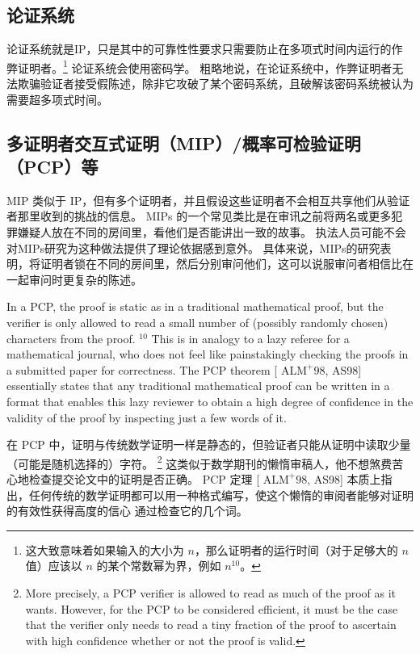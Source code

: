 \subsection{论证系统}
论证系统就是IP，只是其中的可靠性性要求只需要防止在多项式时间内运行的作弊证明者。\footnote{这大致意味着如果输入的大小为 $n$，那么证明者的运行时间（对于足够大的 $n$ 值）应该以 $n$ 的某个常数幂为界，例如 $n^{10} $。}
论证系统会使用密码学。 
粗略地说，在论证系统中，作弊证明者无法欺骗验证者接受假陈述，除非它攻破了某个密码系统，且破解该密码系统被认为需要超多项式时间。

\subsection{多证明者交互式证明（MIP）/概率可检验证明（PCP）等}
MIP 类似于 IP，但有多个证明者，并且假设这些证明者不会相互共享他们从验证者那里收到的挑战的信息。 MIPs 的一个常见类比是在审讯之前将两名或更多犯罪嫌疑人放在不同的房间里，看他们是否能讲出一致的故事。 
执法人员可能不会对MIPs研究为这种做法提供了理论依据感到意外。
具体来说，MIPs的研究表明，将证明者锁在不同的房间里，然后分别审问他们，这可以说服审问者相信比在一起审问时更复杂的陈述。

In a PCP, the proof is static as in a traditional mathematical proof, but the verifier is only allowed to read a small number of (possibly randomly chosen) characters from the proof. ${ }^{10}$ This is in analogy to a lazy referee for a mathematical journal, who does not feel like painstakingly checking the proofs in a submitted paper for correctness. The PCP theorem [ $\mathrm{ALM}^{+} 98$, AS98] essentially states that any traditional mathematical proof can be written in a format that enables this lazy reviewer to obtain a high degree of confidence in the validity of the proof by inspecting just a few words of it.

在 PCP 中，证明与传统数学证明一样是静态的，但验证者只能从证明中读取少量（可能是随机选择的）字符。 \footnote{More precisely, a PCP verifier is allowed to read as much of the proof as it wants. However, for the PCP to be considered efficient, it must be the case that the verifier only needs to read a tiny fraction of the proof to ascertain with high confidence whether or not the proof is valid.
} 这类似于数学期刊的懒惰审稿人，他不想煞费苦心地检查提交论文中的证明是否正确。 
PCP 定理 [ $\mathrm{ALM}^{+} 98$, AS98] 本质上指出，任何传统的数学证明都可以用一种格式编写，使这个懒惰的审阅者能够对证明的有效性获得高度的信心 通过检查它的几个词。

